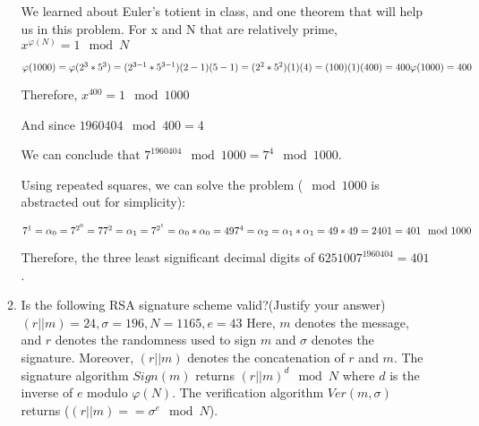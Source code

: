 \documentclass[11pt]{article}
\begin{document}
\begin{enumerate}
\begin{enumerate}
{        We learned about Euler's totient in class, and one theorem that will help us in this problem. \newline
        For x and N that are relatively prime, $x^{\varphi(N)} = 1\mod N$ \newline

        $\varphi(1000) = \varphi(2^3 * 5^3) = (2^{3-1}*5^{3-1})(2-1)(5-1) = (2^2 * 5^2)(1)(4) = (100)(1)(400) = 400 \newline
        \varphi(1000) = 400 \newline$

        Therefore, \newline
        $x^{400} = 1\mod 1000$ \newline

        And since \newline
        $1960404 \mod 400 = 4$ \newline

        We can conclude that $7^{1960404} \mod 1000 = 7^4 \mod 1000$.



        Using repeated squares, we can solve the problem ($\mod 1000$ is abstracted out for simplicity): \newline

        $7^1 = \alpha_0 = 7^{2^0} = 7 \newline
        7^2 = \alpha_1 = 7^{2^1} = \alpha_0 * \alpha_0 = 49 \newline
        7^4 = \alpha_2 = \alpha_1 * \alpha_1 = 49 * 49 = 2401 = 401 \mod 1000 \newline$

        Therefore, the three least significant decimal digits of $6251007^{1960404} = 401$.
      }





    \vspace {0.4\textheight}
    \item Is the following RSA signature scheme valid?(Justify your answer)\newline
    $(r||m)=24, \sigma=196, N=1165, e=43$\newline
    Here, $m$ denotes the message, and $r$ denotes the randomness used to sign $m$ and $\sigma$ denotes the signature. Moreover, $(r||m)$ denotes the concatenation of $r$ and $m$. The signature algorithm $Sign(m)$ returns $(r||m)^d \mod{N}$ where $d$ is the inverse of $e$ modulo $\varphi(N)$. The verification algorithm $Ver(m,\sigma)$ returns ($(r||m)==\sigma^e \mod{N}$). 
    \newline
    {\bfseries

}
\end{enumerate}
\end{enumerate}
\end{document}
